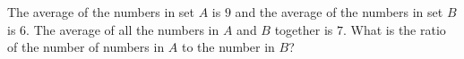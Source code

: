 The average of the numbers in set $A$ is $9$ and the average of the numbers in set $B$ is $6$. The average of all the numbers in $A$ and $B$ together is $7$. What is the ratio of the number of numbers in $A$ to the number in $B$?
